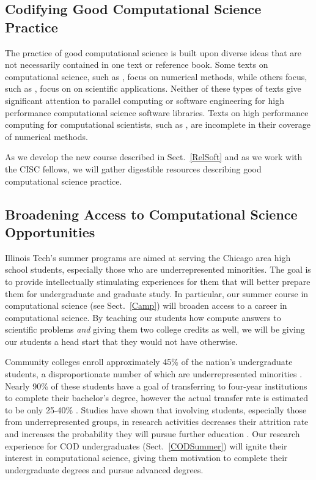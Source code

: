 \documentclass[11pt]{NSFamsart}
\begin{document}
\subsection{Codifying Good Computational Science Practice}
The practice of good computational science is built upon diverse ideas that are not necessarily contained in one text or reference book.  Some texts on computational science, such as \cite{TveEtal10a}, focus on numerical methods, while others focus, such as \cite{Thi13a}, focus on on scientific applications.  Neither of these types of texts give significant attention to parallel computing or software engineering for high performance computational science software libraries. Texts on high performance computing for computational scientists, such as \cite{MagEtal16a}, are incomplete in their coverage of numerical methods.

As we develop the new course described in Sect.~\ref{RelSoft} and as we work with the CISC fellows, we will gather digestible resources describing good computational science practice. 

\subsection{Broadening Access to Computational Science Opportunities}
Illinois Tech's summer programs are aimed at serving the Chicago area high school students, especially those who are underrepresented minorities.  The goal is to provide intellectually stimulating experiences for them that will better prepare them for undergraduate and graduate study. 
In particular, our  summer course in computational science (see Sect.~\ref{Camp}) will broaden access to a career in computational science.  By teaching our students how compute answers to scientific problems \emph{and} giving them two college credits as well, we will be giving our students a head start that they would not have otherwise.

Community colleges enroll approximately 45\% of the nation's undergraduate students, a disproportionate number of which are underrepresented minorities \cite{KnappKG12,nsfreport13}.  Nearly 90\% of these students have a goal of transferring to four-year institutions to complete their bachelor's degree, however the actual transfer rate is estimated to be only 25-40\% \cite{HoachlanderSH03,MelguizoKA11}.  Studies have shown that involving students, especially those from underrepresented groups, in  research activities decreases  their attrition rate and increases the probability they will pursue further education \cite{BarlowV04,JonesBV10}.  Our research experience for COD undergraduates (Sect.~\ref{CODSummer}) will ignite their interest in computational science, giving them motivation to complete their undergraduate degrees and pursue advanced degrees.
\end{document}
